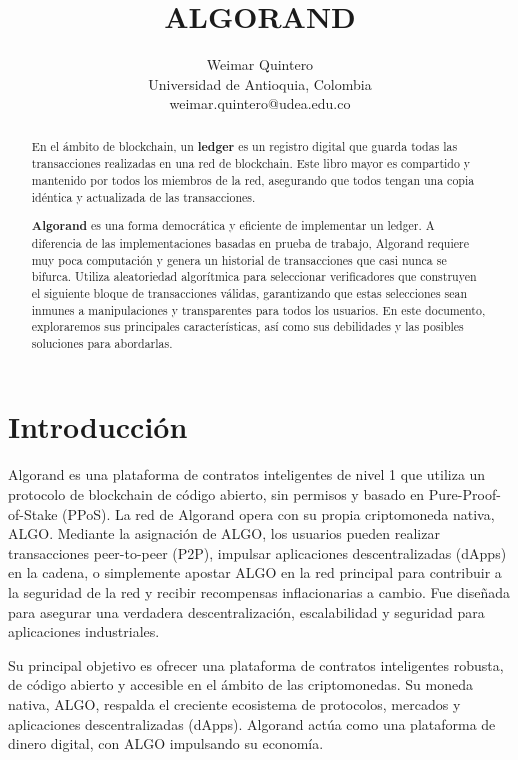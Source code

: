 \documentclass{article}
\title{ALGORAND}
\author{Weimar Quintero \\ Universidad de Antioquia, Colombia \\ 
weimar.quintero@udea.edu.co}
\begin{document}
\maketitle

\begin{abstract}
En el ámbito de blockchain, un \textbf{ledger} es un registro digital que guarda todas las transacciones realizadas en una red de blockchain. Este libro mayor es compartido y mantenido por todos los miembros de la red, asegurando que todos tengan una copia idéntica y actualizada de las transacciones.

\textbf{Algorand} es una forma democrática y eficiente de implementar un ledger. A diferencia de las implementaciones basadas en prueba de trabajo, Algorand requiere muy poca computación y genera un historial de transacciones que casi nunca se bifurca. Utiliza aleatoriedad algorítmica para seleccionar verificadores que construyen el siguiente bloque de transacciones válidas, garantizando que estas selecciones sean inmunes a manipulaciones y transparentes para todos los usuarios.
En este documento, exploraremos sus principales características, así como sus debilidades y las posibles soluciones para abordarlas.


\end{abstract}

\section{Introducción}


Algorand es una plataforma de contratos inteligentes de nivel 1 que utiliza un protocolo de blockchain de código abierto, sin permisos y basado en Pure-Proof-of-Stake (PPoS). La red de Algorand opera con su propia criptomoneda nativa, ALGO. Mediante la asignación de ALGO, los usuarios pueden realizar transacciones peer-to-peer (P2P), impulsar aplicaciones descentralizadas (dApps) en la cadena, o simplemente apostar ALGO en la red principal para contribuir a la seguridad de la red y recibir recompensas inflacionarias a cambio. Fue diseñada para asegurar una verdadera descentralización, escalabilidad y seguridad para aplicaciones industriales.

Su principal objetivo es ofrecer una plataforma de contratos inteligentes robusta, de código abierto y accesible en el ámbito de las criptomonedas. Su moneda nativa, ALGO, respalda el creciente ecosistema de protocolos, mercados y aplicaciones descentralizadas (dApps). Algorand actúa como una plataforma de dinero digital, con ALGO impulsando su economía.
\end{document}
